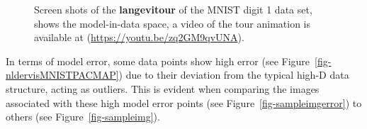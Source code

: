 \documentclass[
  12pt]{article}
\begin{document}
\begin{figure}[H]
\begin{minipage}{0.33\linewidth}
{}

\subcaption{\label{fig-mnist1-sc2}}

\end{minipage}%
%
\begin{minipage}{0.33\linewidth}


\subcaption{\label{fig-mnist1-sc3}}

\end{minipage}%

\caption{\label{fig-mnist1-sc}Screen shots of the \textbf{langevitour}
of the MNIST digit 1 data set, shows the model-in-data space, a video of
the tour animation is available at
(\url{https://youtu.be/zq2GM9qvUNA}).}

\end{figure}%

In terms of model error, some data points show high error (see
Figure~\ref{fig-nldervisMNISTPACMAP}) due to their deviation from the
typical high-D data structure, acting as outliers. This is evident when
comparing the images associated with these high model error points (see
Figure~\ref{fig-sampleimgerror}) to others (see
Figure~\ref{fig-sampleimg}).
\end{document}
